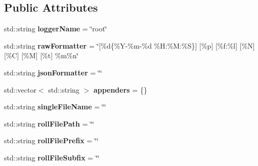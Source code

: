 \subsection*{Public Attributes}
\begin{DoxyCompactItemize}
\item 
\mbox{\label{structdaq_1_1LogConfigStruct_ade3405df5a80a10823ad6e02cb752611}} 
std\+::string {\bfseries logger\+Name} = \char`\"{}root\char`\"{}
\item 
\mbox{\label{structdaq_1_1LogConfigStruct_ae0f3d3079ea92e732bd044458b0ee322}} 
std\+::string {\bfseries raw\+Formatter} = \char`\"{}\mbox{[}\%d\{\%Y-\/\%m-\/\%d \%H\+:\%M\+:\%S\}\mbox{]} \mbox{[}\%p\mbox{]} \mbox{[}\%f\+:\%l\mbox{]} \mbox{[}\%N\mbox{]} \mbox{[}\%C\mbox{]} \mbox{[}\%M\mbox{]} \mbox{[}\%t\mbox{]} \%m\%n\char`\"{}
\item 
\mbox{\label{structdaq_1_1LogConfigStruct_afe11ed37a453d6f92030c13b0e437eea}} 
std\+::string {\bfseries json\+Formatter} = \char`\"{}\char`\"{}
\item 
\mbox{\label{structdaq_1_1LogConfigStruct_aeba3a8722e9b7cca1a10169ccd1e0fa5}} 
std\+::vector$<$ std\+::string $>$ {\bfseries appenders} = \{\}
\item 
\mbox{\label{structdaq_1_1LogConfigStruct_a1deffa67d39ae66486a4d903c99f0a66}} 
std\+::string {\bfseries single\+File\+Name} = \char`\"{}\char`\"{}
\item 
\mbox{\label{structdaq_1_1LogConfigStruct_a951462551669a1e5ed8fdc9c55f7968c}} 
std\+::string {\bfseries roll\+File\+Path} = \char`\"{}\char`\"{}
\item 
\mbox{\label{structdaq_1_1LogConfigStruct_a1c7a237e8e881a358a1f70319fa892f0}} 
std\+::string {\bfseries roll\+File\+Prefix} = \char`\"{}\char`\"{}
\item 
\mbox{\label{structdaq_1_1LogConfigStruct_a86ea6dce8edf4f8666709ff0e3874094}} 
std\+::string {\bfseries roll\+File\+Subfix} = \char`\"{}\char`\"{}
\item 

\end{DoxyCompactItemize}
